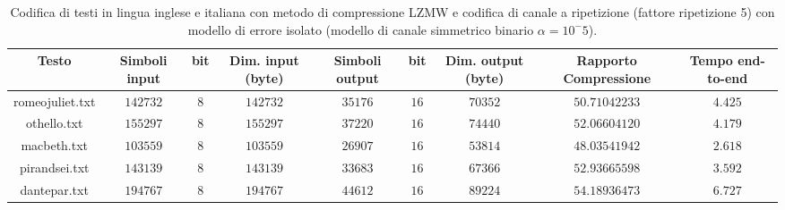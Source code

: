 \documentclass[a4paper,11pt]{article}
\theoremstyle{definition}
\begin{document}
\begin{sidewaystable}
	\scriptsize
	\begin{tabular}{|c|c|c|c|c|c|c|c|c|}
		\hline
		\textbf{Testo}  &  \textbf{Simboli input} &  \textbf{bit} &   \textbf{Dim. input (byte)} & \textbf{Simboli output} & \textbf{bit} &  \textbf{Dim. output (byte)} &  \textbf{Rapporto Compressione} & \textbf{Tempo end-to-end} \\
		
		\hline romeojuliet.txt & $142732$ & $8$ & $142732$ & $35176$ & $16$	& $70352$ & $50.71042233$ & $4.425$ \\
		
		\hline othello.txt & $155297$ & $8$ & $155297$ & $37220$ & $16$	& $74440$ & $52.06604120$ & $4.179$ \\
		
		\hline macbeth.txt & $103559$ & $8$ & $103559$ & $26907$ & $16$	& $53814$ & $48.03541942$ & $2.618$ \\
		
		\hline pirandsei.txt & $143139$ & $8$ & $143139$ & $33683$ & $16$	& $67366$ & $52.93665598$ & $3.592$ \\
		
		\hline dantepar.txt & $194767$ & $8$ & $194767$ & $44612$ & $16$	& $89224$ & $54.18936473$ & $6.727$ \\
		
		\hline		

	\end{tabular}
	\caption{Codifica di testi in lingua inglese e italiana con metodo di compressione LZMW e codifica di canale a ripetizione (fattore ripetizione 5) con modello di errore isolato (modello di canale simmetrico binario $\alpha=10^-5$).}
	\label{tab:lzmw}
	
\end{sidewaystable}
\end{document}
